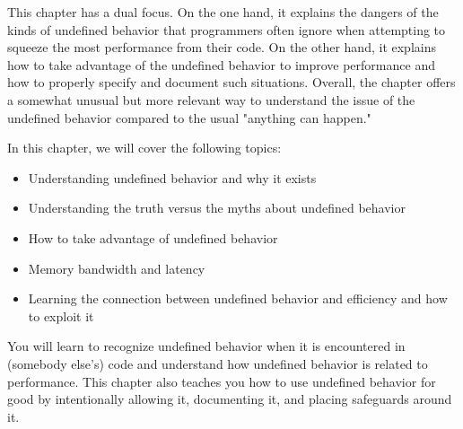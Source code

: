 This chapter has a dual focus. On the one hand, it explains the dangers of the kinds of undefined behavior that programmers often ignore when attempting to squeeze the most performance from their code. On the other hand, it explains how to take advantage of the undefined behavior to improve performance and how to properly specify and document such situations. Overall, the chapter offers a somewhat unusual but more relevant way to understand the issue of the undefined behavior compared to the usual "anything can happen." 

In this chapter, we will cover the following topics:

\begin{itemize}
\item 
Understanding undefined behavior and why it exists

\item 
Understanding the truth versus the myths about undefined behavior

\item 
How to take advantage of undefined behavior

\item 
Memory bandwidth and latency

\item 
Learning the connection between undefined behavior and efficiency and how to exploit it
\end{itemize}

You will learn to recognize undefined behavior when it is encountered in (somebody else's) code and understand how undefined behavior is related to performance. This chapter also teaches you how to use undefined behavior for good by intentionally allowing it, documenting it, and placing safeguards around it.